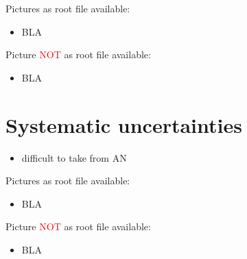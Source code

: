 Pictures as root file available:
\begin{itemize}
\item BLA
\end{itemize}

Picture \textcolor{red}{NOT} as root file available:
\begin{itemize}
\item BLA
\end{itemize}

\chapter{Systematic uncertainties}

\begin{itemize}
\item difficult to take from AN
\end{itemize}

Pictures as root file available:
\begin{itemize}
\item BLA
\end{itemize}

Picture \textcolor{red}{NOT} as root file available:
\begin{itemize}
\item BLA
\end{itemize}

